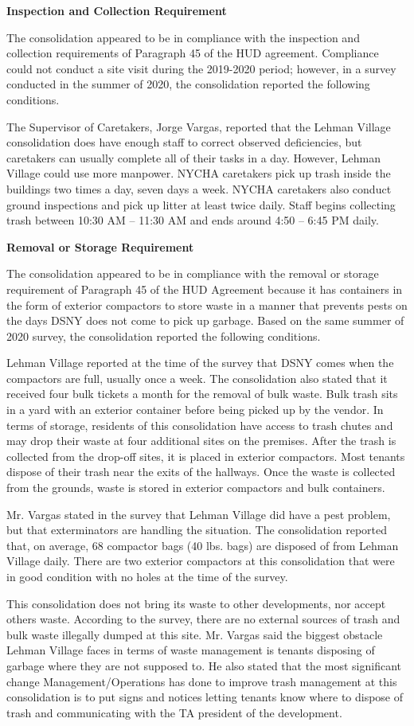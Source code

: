 
\textbf{Inspection and Collection Requirement}

The consolidation appeared to be in compliance with the inspection and collection requirements of Paragraph 45 of the HUD agreement. Compliance could not conduct a site visit during the 2019-2020 period; however, in a survey conducted in the summer of 2020, the consolidation reported the following conditions.

The Supervisor of Caretakers, Jorge Vargas, reported that the Lehman Village consolidation does have enough staff to correct observed deficiencies, but caretakers can usually complete all of their tasks in a day. However, Lehman Village could use more manpower. NYCHA caretakers pick up trash inside the buildings two times a day, seven days a week. NYCHA caretakers also conduct ground inspections and pick up litter at least twice daily. Staff begins collecting trash between 10:30 AM -- 11:30 AM and ends around 4:50 -- 6:45 PM daily. 

\textbf{Removal or Storage Requirement}

The consolidation appeared to be in compliance with the removal or storage requirement of Paragraph  45 of the HUD Agreement because it has containers in the form of exterior compactors to store waste in a manner that prevents pests on the days DSNY does not come to pick up garbage. Based on the same summer of  2020 survey, the consolidation reported the following conditions.

Lehman Village reported at the time of the survey that DSNY comes when the compactors are full, usually once a week. The consolidation also stated that it received four bulk tickets a month for the removal of bulk waste. Bulk trash sits in a yard with an exterior container before being picked up by the vendor. In terms of storage, residents of this consolidation have access to trash chutes and may drop their waste at four additional sites on the premises. After the trash is collected from the drop-off sites, it is placed in exterior compactors. Most tenants dispose of their trash near the exits of the hallways. Once the waste is collected from the grounds, waste is stored in exterior compactors and bulk containers.  

Mr. Vargas stated in the survey that Lehman Village did have a pest problem, but that exterminators are handling the situation. The consolidation reported that, on average, 68 compactor bags (40 lbs. bags) are disposed of from Lehman Village daily. There are two exterior compactors at this consolidation that were in good condition with no holes at the time of the survey. 

This consolidation does not bring its waste to other developments, nor accept others waste. According to the survey, there are no external sources of trash and bulk waste illegally dumped at this site. Mr. Vargas said the biggest obstacle Lehman Village faces in terms of waste management is tenants disposing of garbage where they are not supposed to. He also stated that the most significant change Management/Operations has done to improve trash management at this consolidation is to put signs and notices letting tenants know where to dispose of trash and communicating with the TA president of the development.